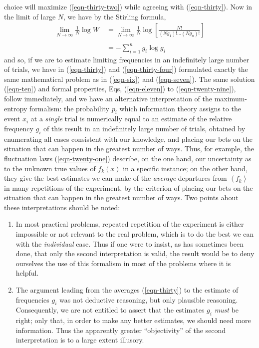 \documentclass[]{article}
\begin{document}
choice will maximize (\ref{eqn-thirty-two}) while agreeing with (\ref{eqn-thirty}). Now in the limit of
large \(N\), we have by the Stirling formula,
%
\begin{align}
\lim_{N \rightarrow \infty} \frac{1}{N}\log W & \  = \lim_{N \rightarrow \infty} \frac{1}{N}\log\left\lbrack
\frac{N!}{\left( Ng_{1} \right)!\ldots\left( Ng_{n} \right)!} \right\rbrack \nonumber \\
\label{eqn-thirty-four}\\
 & \  = - \sum_{i = 1}^{n}   g_{i}\log g_{i} \nonumber
\end{align}
%
and so, if we are to estimate limiting frequencies in an indefinitely
large number of trials, we have in (\ref{eqn-thirty}) and (\ref{eqn-thirty-four}) formulated exactly the
same mathematical problem as in (\ref{eqn-six}) and (\ref{eqn-seven}). The same solution (\ref{eqn-ten}) and
formal properties, Eqs, (\ref{eqn-eleven}) to (\ref{eqn-twenty-nine}), follow immediately, and we have an
alternative interpretation of the maximum-entropy formalism: the
probability \(p_{i}\) which information theory assigns to the event
\(x_{i}\) at a \emph{single} trial is numerically equal to an estimate
of the relative frequency \(g_{i}\) of this result in an indefinitely
large number of trials, obtained by enumerating all cases consistent
with our knowledge, and placing our bets on the situation that can
happen in the greatest number of ways. Thus, for example, the
fluctuation laws (\ref{eqn-twenty-one}) describe, on the one hand, our uncertainty as to
the unknown true values of \(f_{k}(x)\) in a specific instance; on the
other hand, they give the best estimates we can make of the
\emph{average} departures from \(\left\langle f_{k} \right\rangle\) in
many repetitions of the experiment, by the criterion of placing our bets
on the situation that can happen in the greatest number of ways. Two
points about these interpretations should be noted:

\begin{enumerate}

\item
  In most practical problems, repeated repetition of the experiment is
  either impossible or not relevant to the real problem, which is to do
  the best we can with the \emph{individual} case. Thus if one were to
  insist, as has sometimes been done, that only the second
  interpretation is valid, the result would be to deny ourselves the use
  of this formalism in most of the problems where it is helpful.
\item
  The argument leading from the averages (\ref{eqn-thirty}) to the estimate of
  frequencies \(g_{i}\) was not deductive reasoning, but only plausible
  reasoning. Consequently, we are not entitled to assert that the
  estimates \(g_{i}\) \emph{must} be right; only that, in order to make
  any better estimates, we should need more information. Thus the
  apparently greater ``objectivity'' of the second interpretation is to
  a large extent illusory.
\end{enumerate}
\end{document}
